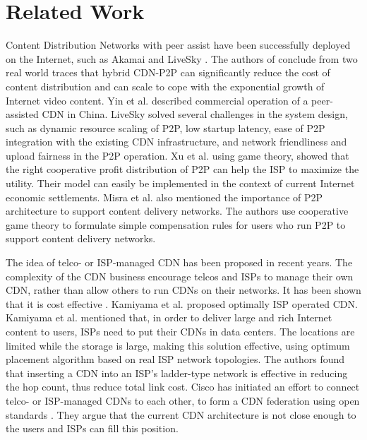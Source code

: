 \documentclass[paper]{ieice}
\begin{document}
\section{Related Work} 

Content Distribution Networks with peer assist have been successfully
deployed on the Internet, such as Akamai
\cite{Huang:2008:UHC:1496046.1496064} and LiveSky
\cite{Yin:2010:LEC:1823746.1823750}.  The authors of
\cite{Huang:2008:UHC:1496046.1496064} conclude from two real world
traces that hybrid CDN-P2P can significantly reduce the cost of
content distribution and can scale to cope with the exponential growth
of Internet video content.  Yin et
al. \cite{Yin:2010:LEC:1823746.1823750} described commercial operation
of a peer-assisted CDN in China.  LiveSky solved several challenges in
the system design, such as dynamic resource scaling of P2P, low
startup latency, ease of P2P integration with the existing CDN
infrastructure, and network friendliness and upload fairness in the
P2P operation.  Xu et al.\cite{DBLP:journals/corr/abs-1212-4915}
using game theory, showed that the right cooperative profit
distribution of P2P can help the ISP to maximize the utility.  Their
model can easily be implemented in the context of current Internet
economic settlements.  Misra et
al.\cite{Misra:2010:IPS:1811099.1811064} also mentioned the
importance of P2P architecture to support content delivery networks.
The authors use cooperative game theory to formulate simple
compensation rules for users who run P2P to support content delivery
networks.

The idea of telco- or ISP-managed CDN has been proposed in recent
years.  The complexity of the CDN business encourage telcos and ISPs
to manage their own CDN, rather than allow others to run CDNs on their
networks.  It has been shown that it is cost effective
\cite{federation}\cite{norton2011internet}.  Kamiyama et
al. \cite{NoriakiKAMIYAMA2013} proposed optimally ISP operated CDN.
Kamiyama et al. mentioned that, in order to deliver large and rich
Internet content to users, ISPs need to put their CDNs in data
centers.  The locations are limited while the storage is large, making
this solution effective, using optimum placement algorithm based on
real ISP network topologies.  The authors found that inserting a CDN
into an ISP's ladder-type network is effective in reducing the hop
count, thus reduce total link cost.  Cisco has initiated an effort to
connect telco- or ISP-managed CDNs to each other, to form a CDN
federation \cite{federation} using open standards \cite{cdni}.  They
argue that the current CDN architecture is not close enough to the
users and ISPs can fill this position.
\end{document}
